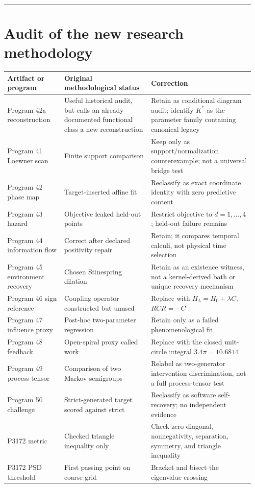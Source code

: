 \documentclass[11pt,a4paper,openany]{report}
\begin{document}
\par\medskip\hrule\medskip

\chapter{Audit of the new research methodology}

\begin{center}
\begingroup\small
\setlength{\tabcolsep}{3.5pt}
\renewcommand{\arraystretch}{1.16}
\begin{longtable}{@{}p{}p{}p{}@{}}
\toprule
\textbf{Artifact or program} & \textbf{Original methodological status} & \textbf{Correction} \\
\midrule
\endhead
Program 42a reconstruction & Useful historical audit, but calls an already documented functional class a new reconstruction & Retain as conditional diagram audit; identify \(K^*\) as the parameter family containing canonical legacy \\
Program 41 Loewner scan & Finite support comparison & Keep only as support/\allowbreak{}normalization counterexample; not a universal bridge test \\
Program 42 phase map & Target-inserted affine fit & Reclassify as exact coordinate identity with zero predictive content \\
Program 43 hazard & Objective leaked held-out points & Restrict objective to \(d=1,\ldots,4\); held-out failure remains \\
Program 44 information flow & Correct after declared positivity repair & Retain; it compares temporal calculi, not physical time selection \\
Program 45 environment recovery & Chosen Stinespring dilation & Retain as an existence witness, not a kernel-derived bath or unique recovery mechanism \\
Program 46 sign reference & Coupling operator constructed but unused & Replace with \(H_\lambda=H_0+\lambda C\), \(RCR=-C\) \\
Program 47 influence proxy & Post-hoc two-parameter regression & Retain only as a failed phenomenological fit \\
Program 48 feedback & Open-spiral proxy called work & Replace with the closed unit-circle integral \(3.4\pi=10.6814\) \\
Program 49 process tensor & Comparison of two Markov semigroups & Relabel as two-generator intervention discrimination, not a full process-tensor test \\
Program 50 challenge & Strict-generated target scored against strict & Reclassify as software self-recovery; no independent evidence \\
P3172 metric & Checked triangle inequality only & Check zero diagonal, nonnegativity, separation, symmetry, and triangle inequality \\
P3172 PSD threshold & First passing point on coarse grid & Bracket and bisect the eigenvalue crossing \\
\bottomrule
\end{longtable}
\endgroup
\end{center}
\end{document}
